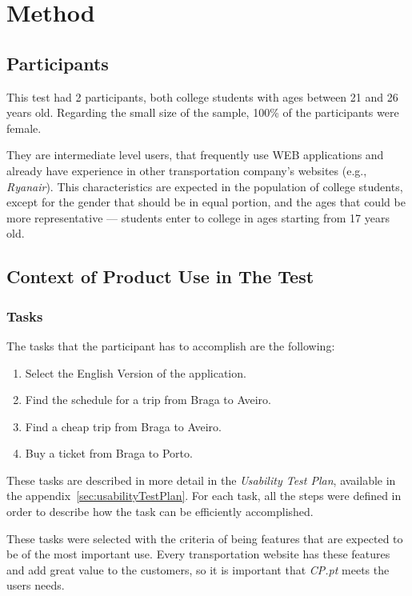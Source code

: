 \documentclass[a4paper]{article}
\begin{document}
\section{Method}

\subsection{Participants}

This test had 2 participants, both college students with ages between 21 and 26 years old. Regarding the small size of the sample, 100\% of the participants were female.

They are intermediate level users, that frequently use WEB applications and already have experience in other transportation company's websites (e.g., \emph{Ryanair}). This characteristics are expected in the population of college students, except for the gender that should be in equal portion, and the ages that could be more representative --- students enter to college in ages starting from 17 years old.

\subsection{Context of Product Use in The Test}
\subsubsection{Tasks}
\label{sec:tasks}
The tasks that the participant has to accomplish are the following:

\begin{enumerate}
  \item Select the English Version of the application.
  \item Find the schedule for a trip from Braga to Aveiro.
  \item Find a cheap trip from Braga to Aveiro.
  \item Buy a ticket from Braga to Porto.
\end{enumerate}

These tasks are described in more detail in the \emph{Usability Test Plan}, available in the appendix~\ref{sec:usabilityTestPlan}. For each task, all the steps were defined in order to describe how the task can be efficiently accomplished.

These tasks were selected with the criteria of being features that are expected to be of the most important use. Every transportation website has these features and add great value to the customers, so it is important that \emph{CP.pt} meets the users needs.
\end{document}
